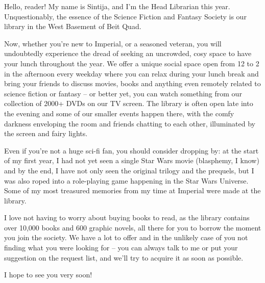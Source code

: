 Hello, reader! My name is Sintija, and I’m the Head Librarian this
year. Unquestionably, the essence of the Science Fiction and Fantasy
Society is our library in the West Basement of Beit Quad.

Now, whether you’re new to Imperial, or a seasoned veteran, you will
undoubtedly experience the dread of seeking an uncrowded, cosy space
to have your lunch throughout the year. We offer a unique social space
open from 12 to 2 in the afternoon every weekday where you can relax
during your lunch break and bring your friends to discuss movies,
books and anything even remotely related to science fiction or fantasy
– or better yet, you can watch something from our collection of 2000+
DVDs on our TV screen. The library is often open late into the evening
and some of our smaller events happen there, with the comfy darkness
enveloping the room and friends chatting to each other, illuminated by
the screen and fairy lights.

Even if you’re not a huge sci-fi fan, you should consider dropping by:
at the start of my first year, I had not yet seen a single Star Wars
movie (blasphemy, I know) and by the end, I have not only seen the
original trilogy and the prequels, but I was also roped into a
role-playing game happening in the Star Wars Universe. Some of my most
treasured memories from my time at Imperial were made at the
library.

I love not having to worry about buying books to read, as the library
contains over 10,000 books and 600 graphic novels, all there for you
to borrow the moment you join the society.  We have a lot to offer and
in the unlikely case of you not finding what you were looking for –
you can always talk to me or put your suggestion on the request list,
and we’ll try to acquire it as soon as possible.

I hope to see you very soon!

